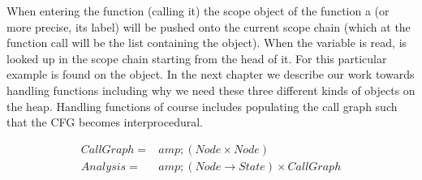 When entering the function (calling it) the scope object of the function a (or more precise, its label) will be pushed onto the current scope chain (which at the function call will be the list containing the  object). When the variable  is read,  is looked up in the scope chain starting from the head of it. For this particular example  is found on the  object. In the next chapter we describe our work towards handling functions including why we need these three different kinds of objects on the heap. Handling functions of course includes populating the call graph such that the CFG becomes interprocedural.

\begin{eqnarray*}
CallGraph =&amp; (Node \times Node) \\
Analysis =&amp; (Node \rightarrow State) \times CallGraph
\end{eqnarray*}